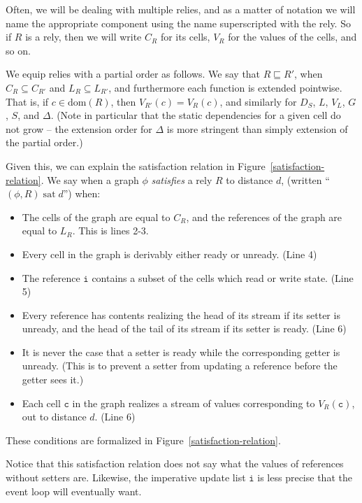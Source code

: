 \documentclass[preprint]{sigplanconf}
\newcommand{\dom}[1]{\mathrm{dom}({#1})}
\newcommand{\term}[1]{\ensuremath{\mathtt{{#1}}}}
\newcommand{\satisfy}[2]{{#1}\;\mathrm{sat}\;{#2}}
\begin{document}
Often, we will be dealing with multiple relies, and as a matter of
notation we will name the appropriate component using the name
superscripted with the rely. So if $R$ is a rely, then we will write
$C_R$ for its cells, $V_R$ for the values of the cells, and so on.

We equip relies with a partial order as follows. We say that $R
\sqsubseteq R'$, when $C_R \subseteq C_{R'}$ and $L_R \subseteq L_{R'}$, and
furthermore each function is extended pointwise. That is, if $c \in
\dom{R}$, then $V_{R'}(c) = V_{R}(c)$, and similarly for $D_S$, $L$,
$V_L$, $G$, $S$, and $\Delta$. (Note in particular that the static
dependencies for a given cell do not grow -- the extension order for
$\Delta$ is more stringent than simply extension of the partial order.)

Given this, we can explain the satisfaction relation in
Figure~\ref{satisfaction-relation}. We say when a graph $\phi$
\emph{satisfies} a rely $R$ to distance $d$, (written
``$\satisfy{(\phi, R)}{d}$'') when:
\begin{itemize}
  \item The cells of the graph are equal to $C_R$, and the references
    of the graph are equal to $L_R$. This is lines 2-3. 
  \item Every cell in the graph is derivably either ready or unready. (Line 4)
  \item The reference \term{i} contains a subset of the cells which 
    read or write state. (Line 5)
  \item Every reference has contents realizing the head of its
    stream if its setter is unready, and the head of the tail of its
    stream if its setter is ready. (Line 6)
  \item It is never the case that a setter is ready while the
    corresponding getter is unready. (This is to prevent a setter
    from updating a reference before the getter sees it.)
  \item Each cell \term{c} in the graph realizes a stream of values corresponding
    to $V_R(\term{c})$, out to distance $d$. (Line 6)
\end{itemize}

These conditions are formalized in Figure~\ref{satisfaction-relation}. 

Notice that this satisfaction relation does not say what the values of
references without setters are. Likewise, the imperative update list
\term{i} is less precise that the event loop will eventually want.
\end{document}
